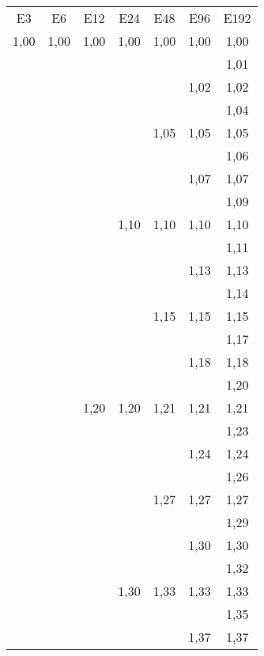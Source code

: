 \begin{tiny}
\begin{tabular}{@{}c@{ }c@{ }c@{ }c@{ }c@{ }c@{ }c}
E3   & E6   & E12  & E24  & E48  & E96  & E192 \\
1,00 & 1,00 & 1,00 & 1,00 & 1,00 & 1,00 & 1,00 \\
     &      &      &      &      &      & 1,01 \\
     &      &      &      &      & 1,02 & 1,02 \\
     &      &      &      &      &      & 1,04 \\
     &      &      &      & 1,05 & 1,05 & 1,05 \\
     &      &      &      &      &      & 1,06 \\
     &      &      &      &      & 1,07 & 1,07 \\
     &      &      &      &      &      & 1,09 \\
     &      &      & 1,10 & 1,10 & 1,10 & 1,10 \\
     &      &      &      &      &      & 1,11 \\
     &      &      &      &      & 1,13 & 1,13 \\
     &      &      &      &      &      & 1,14 \\
     &      &      &      & 1,15 & 1,15 & 1,15 \\
     &      &      &      &      &      & 1,17 \\
     &      &      &      &      & 1,18 & 1,18 \\
     &      &      &      &      &      & 1,20 \\
     &      & 1,20 & 1,20 & 1,21 & 1,21 & 1,21 \\
     &      &      &      &      &      & 1,23 \\
     &      &      &      &      & 1,24 & 1,24 \\
     &      &      &      &      &      & 1,26 \\
     &      &      &      & 1,27 & 1,27 & 1,27 \\
     &      &      &      &      &      & 1,29 \\
     &      &      &      &      & 1,30 & 1,30 \\
     &      &      &      &      &      & 1,32 \\
     &      &      & 1,30 & 1,33 & 1,33 & 1,33 \\
     &      &      &      &      &      & 1,35 \\
     &      &      &      &      & 1,37 & 1,37 \\

\end{tabular}
\end{tiny}

